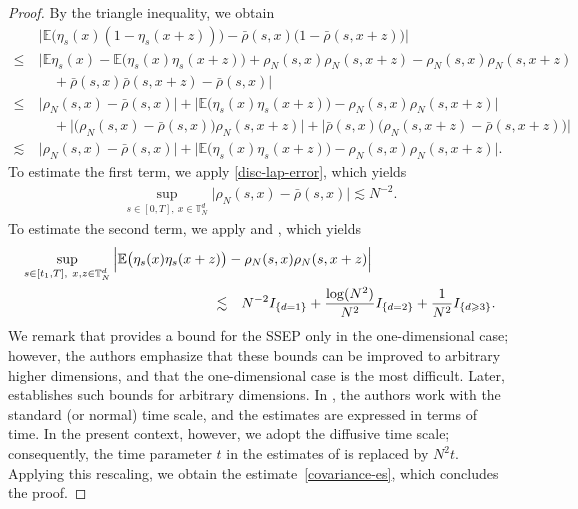 \documentclass[UTF-8,reqno]{amsart}
\numberwithin{equation}{section}
\def\leq{\leqslant}
\def\ge{\geqslant}
\def\leq{\leqslant}
\def\ge{\geqslant}
\begin{document}
\begin{proof}
By the triangle inequality, we obtain
\begin{align*}
&\Big| \mathbb{E} \big( \eta_s(x)(1 - \eta_s(x+z)) \big) - \bar{\rho}(s,x) \big( 1 - \bar{\rho}(s,x+z) \big) \Big| \\
\leq\ & \Big| \mathbb{E} \eta_s(x) - \mathbb{E} \big( \eta_s(x) \eta_s(x+z) \big) + \rho_N(s,x) \rho_N(s,x+z) - \rho_N(s,x) \rho_N(s,x+z) \\
&\quad + \bar{\rho}(s,x) \bar{\rho}(s,x+z) - \bar{\rho}(s,x) \Big| \\
\leq\ & \big| \rho_N(s,x) - \bar{\rho}(s,x) \big| + \big| \mathbb{E} \big( \eta_s(x) \eta_s(x+z) \big) - \rho_N(s,x) \rho_N(s,x+z) \big| \\
&\quad + \big| \big( \rho_N(s,x) - \bar{\rho}(s,x) \big) \rho_N(s,x+z) \big| + \big| \bar{\rho}(s,x) \big( \rho_N(s,x+z) - \bar{\rho}(s,x+z) \big) \big| \\
\lesssim\ & \big| \rho_N(s,x) - \bar{\rho}(s,x) \big| + \big| \mathbb{E} \big( \eta_s(x) \eta_s(x+z) \big) - \rho_N(s,x) \rho_N(s,x+z) \big|.
\end{align*}
To estimate the first term, we apply \eqref{disc-lap-error}, which yields 
\begin{align*}
\sup_{s \in [0,T],\ x \in \mathbb{T}^d_N} \big| \rho_N(s,x) - \bar{\rho}(s,x) \big| \lesssim N^{-2}.
\end{align*}
To estimate the second term, we apply \cite[Theorem 2.1 and Theorem 2.2]{FPV91} and \cite[Theorem 2.3]{FGL00}, which yields
\begin{align}\label{covariance-es}
\sup_{s \in [t_1,T],\ x, z \in \mathbb{T}^d_N} \Big| \mathbb{E} \big( \eta_s(x) \eta_s(x+z) \big)& - \rho_N(s,x) \rho_N(s,x+z) \Big|\notag\\
 \lesssim& \quad N^{-2}I_{\{d=1\}}+\frac{\log(N^2)}{N^2}I_{\{d=2\}}+\frac{1}{N^2}I_{\{d\ge3\}}.
\end{align}
We remark that \cite[Theorem 2.1 and Theorem 2.2]{FPV91} provides a bound for the SSEP only in the one-dimensional case; however, the authors emphasize that these bounds can be improved to arbitrary higher dimensions, and that the one-dimensional case is the most difficult. Later, \cite[Theorem~2.3]{FGL00} establishes such bounds for arbitrary dimensions. In \cite[Theorem~2.3]{FGL00}, the authors work with the standard (or normal) time scale, and the estimates are expressed in terms of time. In the present context, however, we adopt the diffusive time scale; consequently, the time parameter $t$ in the estimates of \cite[Theorem~2.3]{FGL00} is replaced by $N^2 t$. Applying this rescaling, we obtain the estimate~\eqref{covariance-es}, which concludes the proof.
\end{proof}
\end{document}
